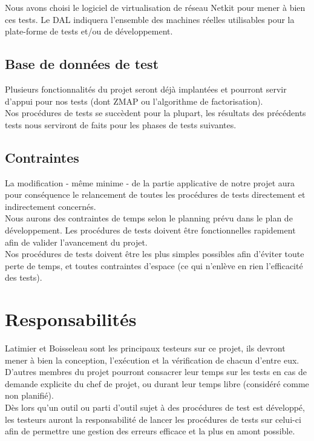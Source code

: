 \documentclass[a4paper,11pt,french]{article}
\begin{document}
Nous avons choisi le logiciel de virtualisation de réseau Netkit pour mener à bien ces tests. Le DAL indiquera l'ensemble des machines réelles utilisables pour la plate-forme de tests et/ou de développement.

\subsection{Base de données de test}

Plusieurs fonctionnalités du projet seront déjà implantées et pourront servir d'appui pour nos tests (dont ZMAP ou l'algorithme de factorisation).\\

Nos procédures de tests se succèdent pour la plupart, les résultats des précédents tests nous serviront de faits pour les phases de tests suivantes.

\subsection{Contraintes}

La modification - même minime - de la partie applicative de notre projet aura pour conséquence le relancement de toutes les procédures de tests directement et indirectement concernés.\\

Nous aurons des contraintes de temps selon le planning prévu dans le plan de développement. Les procédures de tests doivent être fonctionnelles rapidement afin de valider l'avancement du projet.\\

Nos procédures de tests doivent être les plus simples possibles afin d'éviter toute perte de temps, et toutes contraintes d'espace (ce qui n'enlève en rien l'efficacité des tests).


\section{Responsabilités}
Latimier et Boisseleau sont les principaux testeurs sur ce projet, ils devront mener à bien la conception, l'exécution et la vérification de chacun d'entre eux. D'autres membres du projet pourront consacrer leur temps sur les tests en cas de demande explicite du chef de projet, ou durant leur temps libre (considéré comme non planifié).\\


Dès lors qu'un outil ou parti d'outil sujet à des procédures de test est développé, les testeurs auront la responsabilité de lancer les procédures de tests sur celui-ci afin de permettre une gestion des erreurs efficace et la plus en amont possible.  \\
\end{document}
